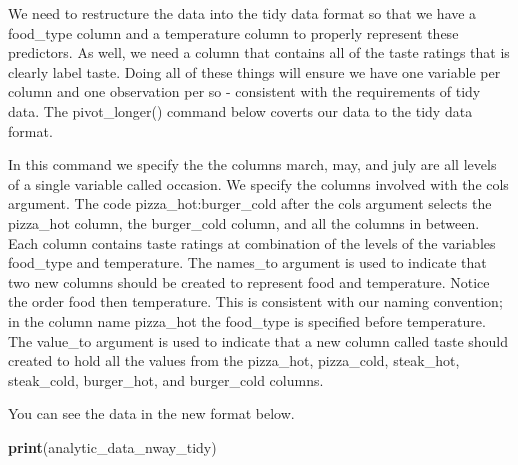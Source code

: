 \documentclass[
]{krantz}
\makeatletter
\newenvironment{Shaded}{\begin{snugshade}}{\end{snugshade}}
\newcommand{\DataTypeTok}[1]{\textcolor[rgb]{0.27,0.27,0.27}{#1}}
\newcommand{\KeywordTok}[1]{\textcolor[rgb]{0.27,0.27,0.27}{\textbf{#1}}}
\newcommand{\NormalTok}[1]{#1}
\newcommand{\OperatorTok}[1]{\textcolor[rgb]{0.43,0.43,0.43}{\textbf{#1}}}
\newcommand{\StringTok}[1]{\textcolor[rgb]{0.5,0.5,0.5}{#1}}
\newenvironment{kframe}{%
\medskip{}
\setlength{\fboxsep}{.8em}
 \def\at@end@of@kframe{}%
 \ifinner\ifhmode%
  \def\at@end@of@kframe{\end{minipage}}%
  \begin{minipage}{\columnwidth}%
 \fi\fi%
 \def\FrameCommand##1{\hskip\@totalleftmargin \hskip-\fboxsep
 \colorbox{shadecolor}{##1}\hskip-\fboxsep
     \hskip-\linewidth \hskip-\@totalleftmargin \hskip\columnwidth}%
 \MakeFramed {\advance\hsize-\width
   \@totalleftmargin\z@ \linewidth\hsize
   \@setminipage}}%
 {\par\unskip\endMakeFramed%
 \at@end@of@kframe}
\renewenvironment{Shaded}{\begin{kframe}}{\end{kframe}}
\makeatother
\begin{document}
We need to restructure the data into the tidy data format so that we have a food\_type column and a temperature column to properly represent these predictors. As well, we need a column that contains all of the taste ratings that is clearly label taste. Doing all of these things will ensure we have one variable per column and one observation per so - consistent with the requirements of tidy data. The pivot\_longer() command below coverts our data to the tidy data format.

In this command we specify the the columns march, may, and july are all levels of a single variable called occasion. We specify the columns involved with the cols argument. The code pizza\_hot:burger\_cold after the cols argument selects the pizza\_hot column, the burger\_cold column, and all the columns in between. Each column contains taste ratings at combination of the levels of the variables food\_type and temperature. The names\_to argument is used to indicate that two new columns should be created to represent food and temperature. Notice the order food then temperature. This is consistent with our naming convention; in the column name pizza\_hot the food\_type is specified before temperature. The value\_to argument is used to indicate that a new column called taste should created to hold all the values from the pizza\_hot, pizza\_cold, steak\_hot, steak\_cold, burger\_hot, and burger\_cold columns.

\begin{Shaded}
\end{Shaded}

You can see the data in the new format below.

\begin{Shaded}
\begin{Highlighting}[]
\KeywordTok{print}\NormalTok{(analytic_data_nway_tidy)}
\end{Highlighting}
\end{Shaded}
\end{document}
